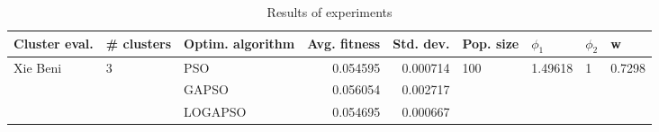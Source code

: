 \begin{table}
\centering
\caption{Results of experiments}
\begin{tabular}{lllrrllll}
\toprule
            Cluster eval. &        \# clusters & Optim. algorithm &  Avg. fitness &  Std. dev. &            Pop. size &               $\phi_{1}$ &         $\phi_{2}$ &                       w \\
\midrule
\multirow{3}{*}{Xie Beni} & \multirow{3}{*}{3} &              PSO &      0.054595 &   0.000714 & \multirow{3}{*}{100} & \multirow{3}{*}{1.49618} & \multirow{3}{*}{1} & \multirow{3}{*}{0.7298} \\
                          &                    &            GAPSO &      0.056054 &   0.002717 &                      &                          &                    &                         \\
                          &                    &          LOGAPSO &      0.054695 &   0.000667 &                      &                          &                    &                         \\
\bottomrule
\end{tabular}
\end{table}
